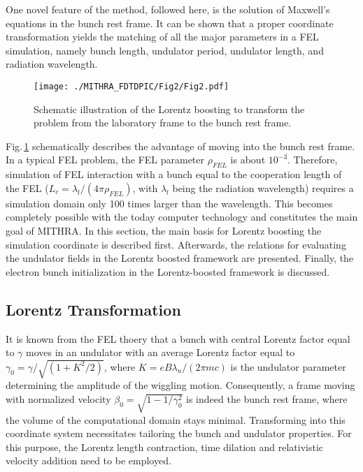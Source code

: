 One novel feature of the method, followed here, is the solution of Maxwell's equations in the bunch rest frame.
%
It can be shown that a proper coordinate transformation yields the matching of all the major parameters in a FEL simulation, namely bunch length, undulator period, undulator length, and radiation wavelength.
%
\begin{figure}
\centering
\texttt{[image: ./MITHRA\_FDTDPIC/Fig2/Fig2.pdf]}
\caption{Schematic illustration of the Lorentz boosting to transform the problem from the laboratory frame to the bunch rest frame.}
\label{FDTDPICFig2}
\end{figure}
%
Fig.\,\ref{FDTDPICFig2} schematically describes the advantage of moving into the bunch rest frame.
%
In a typical FEL problem, the FEL parameter $\rho_{FEL}$ is about $10^{-3}$.
%
Therefore, simulation of FEL interaction with a bunch equal to the cooperation length of the FEL ($L_c=\lambda_l/(4 \pi \rho_{FEL})$, with $\lambda_l$ being the radiation wavelength) requires a simulation domain only 100 times larger than the wavelength.
%
This becomes completely possible with the today computer technology and constitutes the main goal of MITHRA.
%
In this section, the main basis for Lorentz boosting the simulation coordinate is described first.
%
Afterwards, the relations for evaluating the undulator fields in the Lorentz boosted framework are presented.
%
Finally, the electron bunch initialization in the Lorentz-boosted framework is discussed.

\subsection{Lorentz Transformation}

It is known from the FEL thoery that a bunch with central Lorentz factor equal to $\gamma$ moves in an undulator with an average Lorentz factor equal to $\gamma_0=\gamma/\sqrt{(1+K^2/2)}$, where $K=eB\lambda_u/(2\pi m c)$ is the undulator parameter determining the amplitude of the wiggling motion.
%
Consequently, a frame moving with normalized velocity $\beta_0 = \sqrt{1-1/\gamma_0^2}$ is indeed the bunch rest frame, where the volume of the computational domain stays minimal.
%
Transforming into this coordinate system necessitates tailoring the bunch and undulator properties.
%
For this purpose, the Lorentz length contraction, time dilation and relativistic velocity addition need to be employed.

